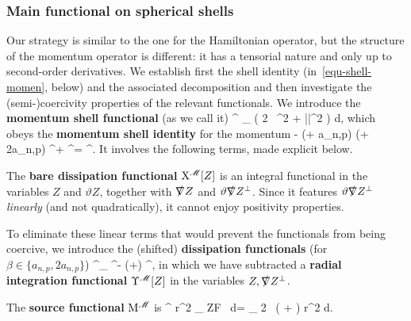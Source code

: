 \documentclass[11pt]{article}
\numberwithin{table}{section}
\numberwithin{equation}{section}
\numberwithin{table}{section}
\numberwithin{figure}{section}
\begin{document}

\subsubsection{Main functional on spherical shells}
 
Our strategy is similar to the one for the Hamiltonian operator, but the structure of the momentum operator is different: it has a tensorial nature and only up to second-order derivatives.
We establish first the shell identity (in~\eqref{equ-shell-momen}, below) and the associated decomposition 
and then investigate the (semi-)coercivity properties of the relevant functionals. 
We introduce the \textbf{momentum shell functional} (as we call it) 
\Phi^\notreM[Z] \coloneqq {} \fint_{\Lambda} \bigl( 2 \, \Zperp{}^2 + |\Zpar|^2 \bigr) d\chi, 
\ee 
which obeys the \textbf{momentum shell identity} for the momentum
\bse
\label{equ-shell-momen}
- (\vartheta + a_{n,p}) (\vartheta + 2a_{n,p}) \Phi^\notreM[Z]
+ \Chi^\notreM[Z] = \Mu^\notreM[Z].
\ee 
It involves the following terms, made explicit below. 

\bei 

\item  The {\bf bare dissipation functional} $\mathrm{X}^{\mathscr{M}}[Z]$ is an integral functional in the variables $Z$ and $\vartheta Z$, together with $\slashed\nabla{} Z$ and $\vartheta\slashed\nabla{}Z^{\perp}$. Since it features $\vartheta\slashed\nabla{}Z^{\perp}$ {\it linearly} (and not quadratically), it cannot enjoy positivity properties.
 
\item To eliminate these linear terms that would prevent the functionals from being coercive, we introduce the (shifted) {\bf dissipation functionals}  (for $\beta\in\{a_{n,p}, 2 a_{n,p}\}$)
\Psi^\notreM_{\beta\iota} \coloneqq \Chi^\notreM - (\vartheta +\beta) \Upsilon^\notreM, 
\ee
in which we have subtracted a {\bf radial integration functional} $\Upsilon^{\mathscr{M}}[Z]$ in the variables $Z, \slashed\nabla{} Z^{\perp}$. 

\item The {\bf source functional} $\mathrm{M}^{\mathscr{M}}$ is
\be
\Mu^\notreM[Z] 
 r^2 \fint_{\Lambda} Z\cdot F \, d\chi = \fint_{\Lambda} 2 \, \bigl( \Zperp \Fperp + \Zpar\cdot\Fpar \bigr) r^2 d\chi. 
\ee 
\eei 
\ese

\end{document}
